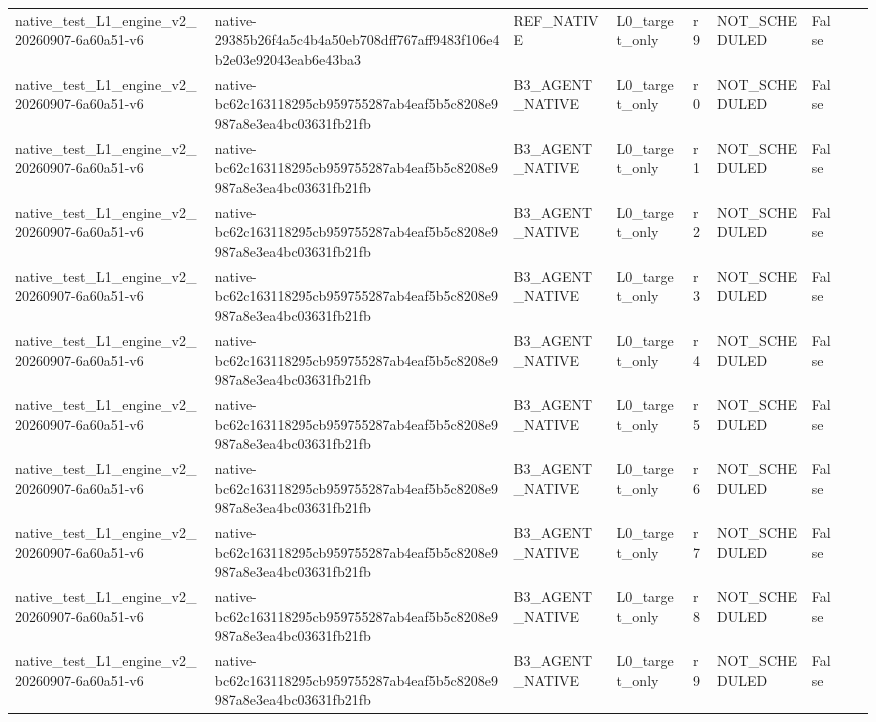\begin{tabular}{lllllllll}
native\_test\_L1\_engine\_v2\_20260907-6a60a51-v6 & native-29385b26f4a5c4b4a50eb708dff767aff9483f106e4b2e03e92043eab6e43ba3 & REF\_NATIVE & L0\_target\_only & r9 & NOT\_SCHEDULED & False &  &  \\
native\_test\_L1\_engine\_v2\_20260907-6a60a51-v6 & native-bc62c163118295cb959755287ab4eaf5b5c8208e9987a8e3ea4bc03631fb21fb & B3\_AGENT\_NATIVE & L0\_target\_only & r0 & NOT\_SCHEDULED & False &  &  \\
native\_test\_L1\_engine\_v2\_20260907-6a60a51-v6 & native-bc62c163118295cb959755287ab4eaf5b5c8208e9987a8e3ea4bc03631fb21fb & B3\_AGENT\_NATIVE & L0\_target\_only & r1 & NOT\_SCHEDULED & False &  &  \\
native\_test\_L1\_engine\_v2\_20260907-6a60a51-v6 & native-bc62c163118295cb959755287ab4eaf5b5c8208e9987a8e3ea4bc03631fb21fb & B3\_AGENT\_NATIVE & L0\_target\_only & r2 & NOT\_SCHEDULED & False &  &  \\
native\_test\_L1\_engine\_v2\_20260907-6a60a51-v6 & native-bc62c163118295cb959755287ab4eaf5b5c8208e9987a8e3ea4bc03631fb21fb & B3\_AGENT\_NATIVE & L0\_target\_only & r3 & NOT\_SCHEDULED & False &  &  \\
native\_test\_L1\_engine\_v2\_20260907-6a60a51-v6 & native-bc62c163118295cb959755287ab4eaf5b5c8208e9987a8e3ea4bc03631fb21fb & B3\_AGENT\_NATIVE & L0\_target\_only & r4 & NOT\_SCHEDULED & False &  &  \\
native\_test\_L1\_engine\_v2\_20260907-6a60a51-v6 & native-bc62c163118295cb959755287ab4eaf5b5c8208e9987a8e3ea4bc03631fb21fb & B3\_AGENT\_NATIVE & L0\_target\_only & r5 & NOT\_SCHEDULED & False &  &  \\
native\_test\_L1\_engine\_v2\_20260907-6a60a51-v6 & native-bc62c163118295cb959755287ab4eaf5b5c8208e9987a8e3ea4bc03631fb21fb & B3\_AGENT\_NATIVE & L0\_target\_only & r6 & NOT\_SCHEDULED & False &  &  \\
native\_test\_L1\_engine\_v2\_20260907-6a60a51-v6 & native-bc62c163118295cb959755287ab4eaf5b5c8208e9987a8e3ea4bc03631fb21fb & B3\_AGENT\_NATIVE & L0\_target\_only & r7 & NOT\_SCHEDULED & False &  &  \\
native\_test\_L1\_engine\_v2\_20260907-6a60a51-v6 & native-bc62c163118295cb959755287ab4eaf5b5c8208e9987a8e3ea4bc03631fb21fb & B3\_AGENT\_NATIVE & L0\_target\_only & r8 & NOT\_SCHEDULED & False &  &  \\
native\_test\_L1\_engine\_v2\_20260907-6a60a51-v6 & native-bc62c163118295cb959755287ab4eaf5b5c8208e9987a8e3ea4bc03631fb21fb & B3\_AGENT\_NATIVE & L0\_target\_only & r9 & NOT\_SCHEDULED & False &  &  \\

\end{tabular}
